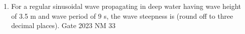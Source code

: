 \begin{enumerate}[label=\thechapter.\arabic*,ref=\thechapter.\theenumi]

\item For a regular sinusoidal wave propagating in deep water having wave height of 3.5 m and wave period of 9 s, the wave steepness is \underline{\hspace{1cm}} (round off to three decimal places).
\hfill Gate 2023 NM 33
\solution
\newpage

\end{enumerate}
